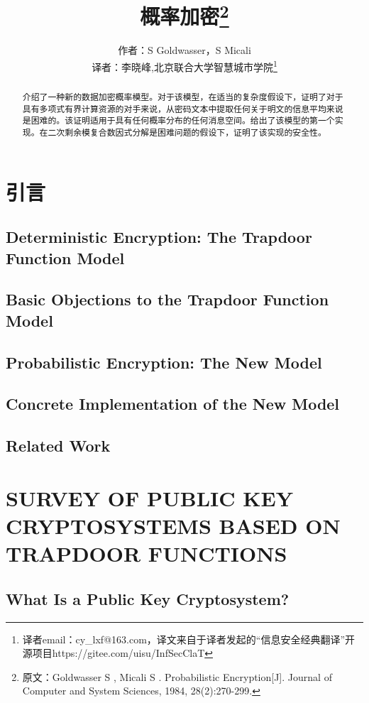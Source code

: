 \documentclass[]{article}
\title{概率加密\footnote{原文：Goldwasser S ,  Micali S . Probabilistic Encryption[J]. Journal of Computer and System Sciences, 1984, 28(2):270-299.}}
\author{作者：S Goldwasser，S Micali\\
\small{译者：李晓峰,北京联合大学智慧城市学院\footnote{译者email：cy\_lxf@163.com，译文来自于译者发起的“信息安全经典翻译”开源项目https://gitee.com/uisu/InfSecClaT}}
}
\begin{document}
\maketitle

\begin{abstract}
介绍了一种新的数据加密概率模型。对于该模型，在适当的复杂度假设下，证明了对于具有多项式有界计算资源的对手来说，从密码文本中提取任何关于明文的信息平均来说是困难的。该证明适用于具有任何概率分布的任何消息空间。给出了该模型的第一个实现。在二次剩余模复合数因式分解是困难问题的假设下，证明了该实现的安全性。
\end{abstract}

\section{引言}


\subsection{Deterministic Encryption: The Trapdoor Function Model}

\subsection{Basic Objections to the Trapdoor Function Model}


\subsection{Probabilistic Encryption: The New Model}



\subsection{Concrete Implementation of the New Model}



\subsection{Related Work}


\section{SURVEY OF PUBLIC KEY CRYPTOSYSTEMS BASED ON TRAPDOOR FUNCTIONS}


\subsection{What Is a Public Key Cryptosystem?}
\end{document}
